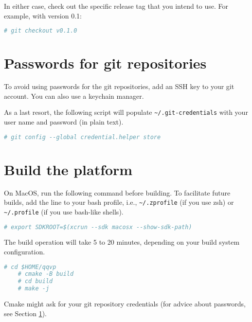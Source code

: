 In either case, check out the specific release tag that you intend to use. For example, with version 0.1:

\small
\begin{lstlisting}[language=bash]
    # git checkout v0.1.0
\end{lstlisting}
\normalsize


\section{Passwords for git repositories}
\label{sec:passwords-git-repos}

To avoid using passwords for the git repositories, add an SSH key to your git account. You can also use a keychain manager.

As a last resort, the following script will populate {\small{\lstinline!~/.git-credentials!}} with your user name and password (in plain text).

\small
\begin{lstlisting}[language=bash]
    # git config --global credential.helper store
\end{lstlisting}
\normalsize


\section{Build the platform}

\note On MacOS, run the following command before building. To facilitate
future builds, add the line to your bash profile, i.e.,
{\small{\lstinline!~/.zprofile!}} (if you use zsh) or
{\small{\lstinline!~/.profile!}} (if you use bash-like shells).

\small
\begin{lstlisting}[language=bash]
    # export SDKROOT=$(xcrun --sdk macosx --show-sdk-path)
\end{lstlisting}
\normalsize



The build operation will take 5 to 20 minutes, depending on your build system configuration.

\small
\begin{lstlisting}[language=bash]
    # cd $HOME/qqvp
    # cmake -B build
    # cd build
    # make -j
\end{lstlisting}
\normalsize

Cmake might ask for your git repository credentials (for advice about passwords, see Section \ref{sec:passwords-git-repos}). \vspace{6pt}

